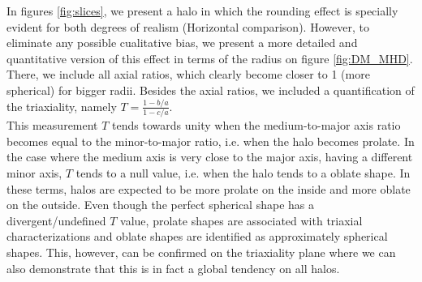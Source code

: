 In figures \ref{fig:slices}, we present a halo in which the rounding effect is specially evident for both degrees of realism (Horizontal comparison). However, to eliminate any possible cualitative bias, we present a more detailed and quantitative version of this effect in terms of the radius on figure \ref{fig:DM_MHD}. There, we include all axial ratios, which clearly become closer to 1 (more spherical) for bigger radii. Besides the axial ratios, we included a quantification of the triaxiality, namely $T=\frac{1-b/a}{1-c/a}$.\\

 This measurement $T$ tends towards unity when the medium-to-major axis ratio becomes equal to the minor-to-major ratio, i.e. when the halo becomes prolate. In the case where the medium axis is very close to the major axis, having a different minor axis, $T$ tends to a null value, i.e. when the halo tends to a oblate shape. In these terms, halos are expected to be more prolate on the inside and more oblate on the outside. Even though the perfect spherical shape has a divergent/undefined $T$ value, prolate shapes are associated with triaxial characterizations and oblate shapes are identified as approximately spherical shapes. This, however, can be confirmed on the triaxiality plane where we can also demonstrate that this is in fact a global tendency on all halos.\\



